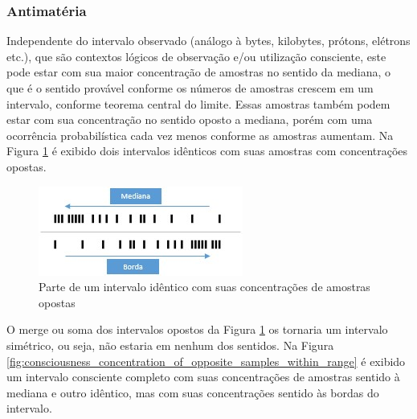 \subsubsection{Antimatéria}
Independente do intervalo observado (análogo à bytes, kilobytes, prótons, elétrons etc.), que são contextos lógicos de observação e/ou utilização consciente, este pode estar com sua maior concentração de amostras no sentido da mediana, o que é o sentido provável conforme os números de amostras crescem em um intervalo, conforme teorema central do limite. Essas amostras também podem estar com sua concentração no sentido oposto a mediana, porém com uma ocorrência probabilística cada vez menos conforme as amostras aumentam. Na Figura \ref{fig:consciousness_concentration_of_opposite_samples} é exibido dois intervalos idênticos com suas amostras com concentrações opostas.

\begin{figure}[H]
\caption{Parte de um intervalo idêntico com suas concentrações de amostras opostas}
\label{fig:consciousness_concentration_of_opposite_samples}
\centering
\includegraphics[scale=1]{sections/images/consciousness_concentration_of_opposite_samples.jpg}
\end{figure}

O merge ou soma dos intervalos opostos da Figura \ref{fig:consciousness_concentration_of_opposite_samples} os tornaria um intervalo simétrico, ou seja, não estaria em nenhum dos sentidos.
Na Figura \ref{fig:consciousness_concentration_of_opposite_samples_within_range} é exibido um intervalo consciente completo com suas concentrações de amostras sentido à mediana e outro idêntico, mas com suas concentrações sentido às bordas do intervalo.


